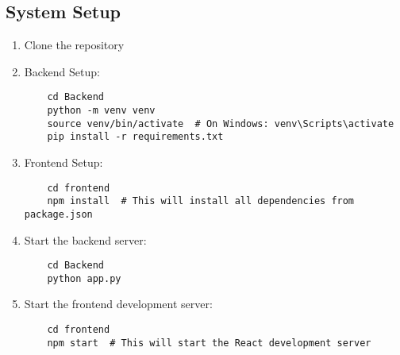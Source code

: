 \documentclass[12pt,a4paper]{article}
\begin{document}
\subsection{System Setup}
\begin{enumerate}
    \item Clone the repository
    \item Backend Setup:
    \begin{lstlisting}
    cd Backend
    python -m venv venv
    source venv/bin/activate  # On Windows: venv\Scripts\activate
    pip install -r requirements.txt
    \end{lstlisting}
    \item Frontend Setup:
    \begin{lstlisting}
    cd frontend
    npm install  # This will install all dependencies from package.json
    \end{lstlisting}
    \item Start the backend server:
    \begin{lstlisting}
    cd Backend
    python app.py
    \end{lstlisting}
    \item Start the frontend development server:
    \begin{lstlisting}
    cd frontend
    npm start  # This will start the React development server
    \end{lstlisting}
\end{enumerate}
\end{document}
